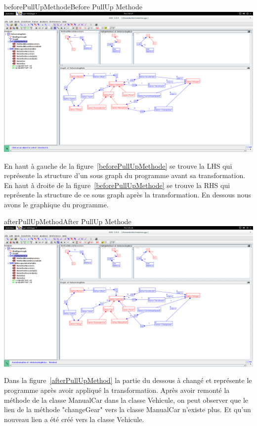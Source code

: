 \documentclass[a4paper, 12pt]{article}
\begin{document}
\begin{enumerate}
\begin{myfig}{beforePullUpMethode}{Before PullUp Methode}
\includegraphics[width=\textwidth]{beforePullUpMethode.png}
\end{myfig}

En haut à gauche de la figure~\ref{beforePullUpMethode} se trouve la LHS qui représente la structure d'un sous graph du programme avant sa transformation. 
En haut à droite de la figure~\ref{beforePullUpMethode} se trouve la RHS qui représente la structure de ce sous graph après la transformation.
En dessous nous avons le graphique du programme.

\begin{myfig}{afterPullUpMethod}{After PullUp Methode}
\includegraphics[width=\textwidth]{afterPullUpMethod.png}
\end{myfig}

Dans la figure~\ref{afterPullUpMethod} la partie du dessous à changé et représente le programme après avoir appliqué la transformation.
Après avoir remonté la méthode de la classe ManualCar dans la classe Vehicule, on peut observer que le lien de la méthode "changeGear" vers la classe ManualCar n'existe plus. Et qu'un nouveau lien a été créé vers la classe Vehicule.


\end{enumerate}
\end{document}
